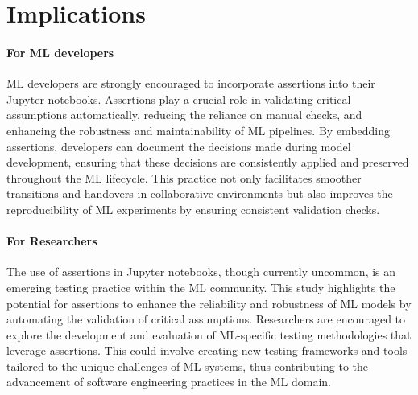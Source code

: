 



\section{Implications}


\paragraph{\textbf{For ML developers}} ML developers are strongly encouraged to incorporate assertions into their Jupyter notebooks. Assertions play a crucial role in validating critical assumptions automatically, reducing the reliance on manual checks, and enhancing the robustness and maintainability of ML pipelines. By embedding assertions, developers can document the decisions made during model development, ensuring that these decisions are consistently applied and preserved throughout the ML lifecycle. This practice not only facilitates smoother transitions and handovers in collaborative environments but also improves the reproducibility of ML experiments by ensuring consistent validation checks.

\paragraph{\textbf{For Researchers}} The use of assertions in Jupyter notebooks, though currently uncommon, is an emerging testing practice within the ML community. This study highlights the potential for assertions to enhance the reliability and robustness of ML models by automating the validation of critical assumptions. Researchers are encouraged to explore the development and evaluation of ML-specific testing methodologies that leverage assertions. This could involve creating new testing frameworks and tools tailored to the unique challenges of ML systems, thus contributing to the advancement of software engineering practices in the ML domain.

